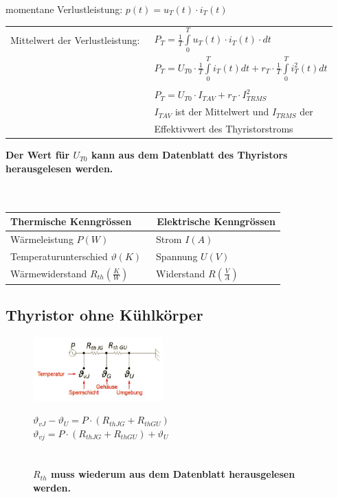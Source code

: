 momentane Verlustleistung: $p(t) = u_{T}(t) \cdot i_{T}(t)$\\
\begin{tabular}{ll}
  Mittelwert der Verlustleistung: &\ $P_{T} = \frac{1}{T}\int\limits_{0}^{T}u_{T}(t) \cdot i_{T}(t) \cdot dt$\\
  &\ $P_{T} = U_{T0} \cdot \frac{1}{T}\int\limits_{0}^{T}i_{T}(t)dt+r_{T} \cdot \frac{1}{T}\int\limits_{0}^{T}i_{T}^2(t)dt$\\\\
  &\ $P_{T} = U_{T0} \cdot I_{T AV} + r_{T} \cdot I_{T RMS}^2$\\
  &\ $I_{T AV}$ ist der Mittelwert und $I_{T RMS}$ der\\ &\ Effektivwert des Thyristorstroms\\
\end{tabular}

\textbf{Der Wert für $U_{T0}$ kann aus dem Datenblatt des Thyristors herausgelesen werden.}\\\\\\
\begin{tabular}{|l|l|}
  \hline
  \textbf{Thermische Kenngrössen} &\ \textbf{Elektrische Kenngrössen}\\
  \hline
  Wärmeleistung $ P (W) $ &\ Strom $ I (A) $\\
  \hline
  Temperaturunterschied $\vartheta (K)$ &\ Spannung $U (V)$\\
  \hline
  Wärmewiderstand $R_{th} (\frac{K}{W})$ &\ Widerstand $R (\frac{V}{A})$\\
  \hline
\end{tabular}

\subsection{Thyristor ohne Kühlkörper}
\begin{figure}[htbp]
  \begin{minipage}[t]{6cm}
    \vspace{0pt}
    \centering
    \includegraphics[width = 5cm]{./pictures/ohneKuehlkoerper} 
  \end{minipage}
  \hfill
  \begin{minipage}[t]{6cm}
    \vspace{0pt}
    $\vartheta_{vJ} - \vartheta_{U} = P \cdot (R_{th JG}+ R_{th GU})$\\
    $ \vartheta_{vj} = P \cdot (R_{th JG}+ R_{th GU}) + \vartheta_{U}$\\\\\\
    \textbf{$R_{th}$ muss wiederum aus dem Datenblatt herausgelesen werden.}
  \end{minipage}
\end{figure}

